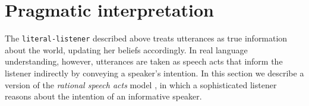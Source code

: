 \documentclass[pdfextras]{handbook}
\begin{document}
        
%



\section{Pragmatic interpretation}
\label{pragmatics}

The \lstinline{literal-listener} described above treats utterances as true information about the world, updating her beliefs accordingly. 
In real language understanding, however, utterances are taken as speech acts that inform the listener indirectly by conveying a speaker's intention. In this section we describe a version of the \emph{rational speech acts} model \citep{goodman2013knowledge,frankgoodman12}, in which a sophisticated listener reasons about the intention of an informative speaker.
\end{document}
